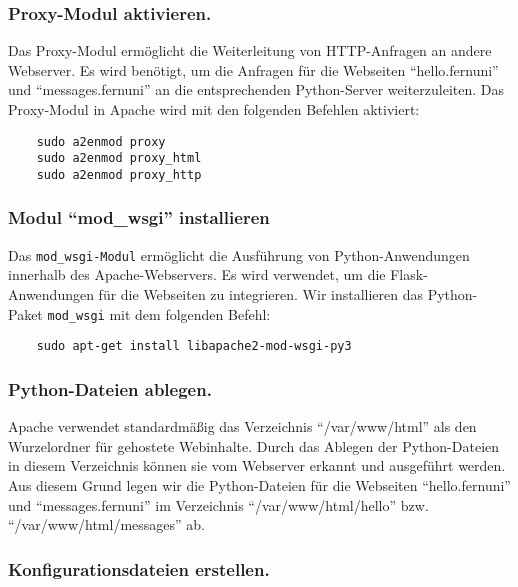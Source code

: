 \subsubsection*{Proxy-Modul aktivieren.}
Das Proxy-Modul ermöglicht die Weiterleitung von HTTP-Anfragen an andere Webserver. Es wird benötigt, um die Anfragen für die Webseiten \enquote{hello.fernuni} und \enquote{messages.fernuni} an die entsprechenden Python-Server weiterzuleiten.
Das Proxy-Modul in Apache wird mit den folgenden Befehlen aktiviert:

\begin{verbatim}
    sudo a2enmod proxy
    sudo a2enmod proxy_html
    sudo a2enmod proxy_http
\end{verbatim}

\subsubsection*{Modul \enquote{mod\_wsgi} installieren}

Das \verb+mod_wsgi-Modul+ ermöglicht die Ausführung von Python-Anwendungen innerhalb des Apache-Webservers. Es wird verwendet, um die Flask-Anwendungen für die Webseiten zu integrieren.
Wir installieren das Python-Paket \verb+mod_wsgi+ mit dem folgenden Befehl:

\begin{verbatim}
    sudo apt-get install libapache2-mod-wsgi-py3
\end{verbatim}

\subsubsection*{Python-Dateien ablegen.}

Apache verwendet standardmäßig das Verzeichnis \enquote{/var/www/html} als den Wurzelordner für gehostete Webinhalte. Durch das Ablegen der Python-Dateien in diesem Verzeichnis können sie vom Webserver erkannt und ausgeführt werden.
Aus diesem Grund legen wir die Python-Dateien für die Webseiten \enquote{hello.fernuni} und \enquote{messages.fernuni} im Verzeichnis \enquote{/var/www/html/hello}  bzw. \enquote{/var/www/html/messages} ab. 

\subsubsection*{Konfigurationsdateien erstellen.}

